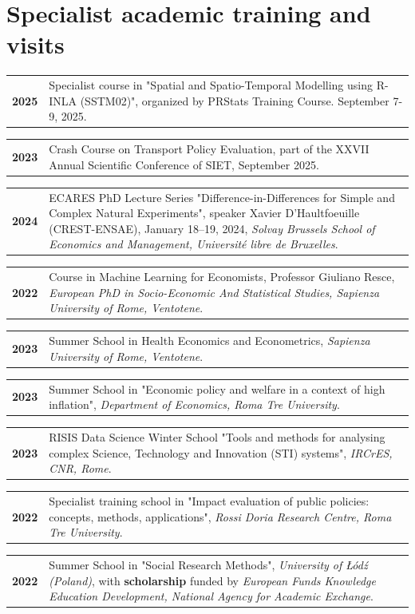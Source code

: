 \documentclass[11pt,a4paper,sans]{moderncv} %
\newcommand{\cvitemcols}[3]{%
  \begin{tabular}{p{#1}p{\dimexpr\linewidth-#1\relax}}
    \textbf{#2} & #3
  \end{tabular}\par\vspace{6pt}
}
\begin{document}

\section{\textbf{Specialist academic training and visits}}

\cvitemcols{2cm}{2025}{Specialist course in "Spatial and Spatio-Temporal Modelling using R-INLA (SSTM02)", organized by PRStats Training Course. September 7-9, 2025.}

\cvitemcols{2cm}{2023}{Crash Course on Transport Policy Evaluation, part of the XXVII Annual Scientific Conference of SIET, September 2025.}

\cvitemcols{2cm}{2024}{ECARES PhD Lecture Series "Difference-in-Differences for Simple and Complex Natural Experiments", speaker Xavier D'Haultfoeuille (CREST-ENSAE), January 18–19, 2024, \textit{Solvay Brussels School of Economics and Management, Université libre de Bruxelles}.}

\cvitemcols{2cm}{2022}{Course in Machine Learning for Economists, Professor Giuliano Resce, \textit{European PhD in Socio-Economic And Statistical Studies, Sapienza University of Rome, Ventotene}.}

\cvitemcols{2cm}{2023}{Summer School in Health Economics and Econometrics, \textit{Sapienza University of Rome, Ventotene}.}

\cvitemcols{2cm}{2023}{Summer School in "Economic policy and welfare in a context of high inflation", \textit{Department of Economics, Roma Tre University}.}

\cvitemcols{2cm}{2023}{RISIS Data Science Winter School "Tools and methods for analysing complex Science, Technology and Innovation (STI) systems", \textit{IRCrES, CNR, Rome}.}

\cvitemcols{2cm}{2022}{Specialist training school in "Impact evaluation of public policies: concepts, methods, applications", \textit{Rossi Doria Research Centre, Roma Tre University}.}

\cvitemcols{2cm}{2022}{Summer School in "Social Research Methods", \textit{University of Łódź (Poland)}, with \textbf{scholarship} funded by \textit{European Funds Knowledge Education Development, National Agency for Academic Exchange}.}
\end{document}
